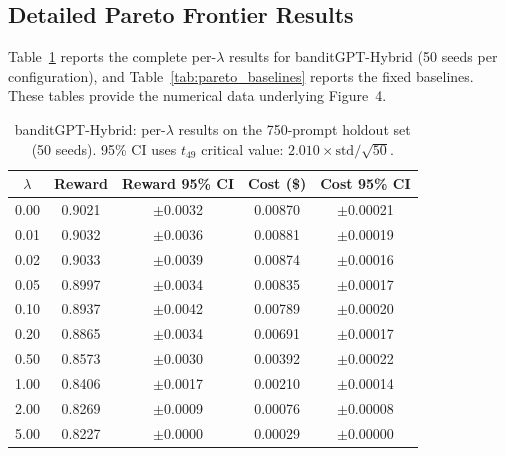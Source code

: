 
\subsection{Detailed Pareto Frontier Results}
\label{appendix:pareto_detailed}

Table~\ref{tab:pareto_banditgpt} reports the complete per-$\lambda$ results
for banditGPT-Hybrid (50 seeds per configuration), and
Table~\ref{tab:pareto_baselines} reports the fixed baselines.  These tables
provide the numerical data underlying Figure~4.

\begin{table}[h]
\centering
\caption{banditGPT-Hybrid: per-$\lambda$ results on the 750-prompt holdout
set (50 seeds).  95\% CI uses $t_{49}$ critical value: $2.010 \times \text{std} / \sqrt{50}$.}
\label{tab:pareto_banditgpt}
\small
\begin{tabular}{@{}ccccc@{}}
\toprule
$\lambda$ & \textbf{Reward} & \textbf{Reward 95\% CI} & \textbf{Cost (\$)} & \textbf{Cost 95\% CI} \\
\midrule
0.00 & 0.9021 & $\pm$0.0032 & 0.00870 & $\pm$0.00021 \\
0.01 & 0.9032 & $\pm$0.0036 & 0.00881 & $\pm$0.00019 \\
0.02 & 0.9033 & $\pm$0.0039 & 0.00874 & $\pm$0.00016 \\
0.05 & 0.8997 & $\pm$0.0034 & 0.00835 & $\pm$0.00017 \\
0.10 & 0.8937 & $\pm$0.0042 & 0.00789 & $\pm$0.00020 \\
0.20 & 0.8865 & $\pm$0.0034 & 0.00691 & $\pm$0.00017 \\
0.50 & 0.8573 & $\pm$0.0030 & 0.00392 & $\pm$0.00022 \\
1.00 & 0.8406 & $\pm$0.0017 & 0.00210 & $\pm$0.00014 \\
2.00 & 0.8269 & $\pm$0.0009 & 0.00076 & $\pm$0.00008 \\
5.00 & 0.8227 & $\pm$0.0000 & 0.00029 & $\pm$0.00000 \\
\bottomrule
\end{tabular}
\end{table}

